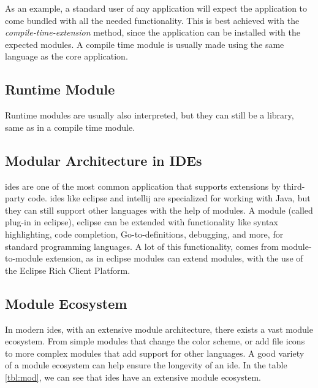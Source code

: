 As an example, a standard user of any application will expect the application to
come bundled with all the needed functionality. This is best achieved with the
\textit{compile-time-extension} method, since the application can be installed
with the expected modules. A compile time module is usually made using the same
language as the core application.

\subsection{Runtime Module}


Runtime modules are usually also interpreted, but they can still be a
library, same as in a compile time module.

\subsection{Modular Architecture in IDEs}

\gls{ide}s are one of the most common application that supports extensions by
third-party code. \gls{ide}s like \gls{eclipse} and \gls{intellij} are
specialized for working with Java, but they can still support other languages
with the help of modules. A module (called plug-in in \gls{eclipse}),
\gls{eclipse} can be extended with functionality like syntax highlighting, code
completion, Go-to-definitions, debugging, and more, for standard programming
languages. A lot of this functionality, comes from module-to-module extension,
as in \gls{eclipse} modules can extend modules, with the use of the Eclipse Rich
Client Platform. \cite{eclipseRcp}

\subsection{Module Ecosystem}


In modern \gls{ide}s, with an extensive module architecture, there exists a
vast module ecosystem. From simple modules that change the color scheme, or
add file icons to more complex modules that add support for other languages.
A good variety of a module ecosystem can help ensure the longevity of an
\gls{ide}. In the table \ref{tbl:mod}, we can see that \gls{ide}s have an
extensive module ecosystem. \footnotemark


